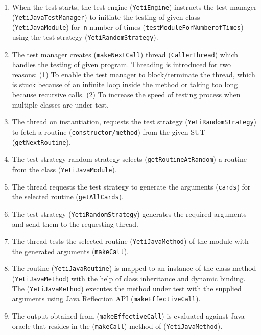\begin{enumerate}
\item When the test starts, the test engine (\verb+YetiEngine+) instructs the test manager (\verb+YetiJavaTestManager+) to initiate the testing of given class (\verb+YetiJavaModule+) for~\verb+n+ number of times (\verb+testModuleForNumberofTimes+) using the test strategy (\verb+YetiRandomStrategy+).

\item The test manager creates (\verb+makeNextCall+) thread (\verb+CallerThread+) which handles the testing of given program. Threading is introduced for two reasons: (1) To enable the test manager to block/terminate the thread, which is stuck because of an infinite loop inside the method or taking too long because recursive calls. (2) To increase the speed of testing process when multiple classes are under test.

\item The thread on instantiation, requests the test strategy (\verb+YetiRandomStrategy+) to fetch a routine (\verb+constructor/method+) from the given SUT (\verb+getNextRoutine+).

\item The test strategy random strategy selects (\verb+getRoutineAtRandom+) a routine from the class (\verb+YetiJavaModule+).

\item The thread requests the test strategy to generate the arguments (\verb+cards+) for the selected routine (\verb+getAllCards+).

 \item The test strategy (\verb+YetiRandomStrategy+) generates the required arguments and send them to the requesting thread.
 
 \item The thread tests the selected routine (\verb+YetiJavaMethod+) of the module with the generated arguments (\verb+makeCall+).
 
 \item The routine (\verb+YetiJavaRoutine+) is mapped to an instance of the class method (\verb+YetiJavaMethod+) with the help of class inheritance and dynamic binding. The (\verb+YetiJavaMethod+) executes the method under test with the supplied arguments using Java Reflection API (\verb+makeEffectiveCall+).
 
\item The output obtained from (\verb+makeEffectiveCall+) is evaluated against Java oracle that resides in the (\verb+makeCall+) method of (\verb+YetiJavaMethod+).

\end{enumerate}



